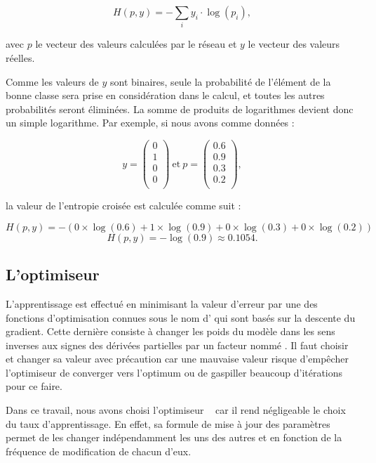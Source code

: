 $$
H(p, y) = -\sum_i y_i \cdot \log(p_i),
$$

avec $p$ le vecteur des valeurs calculées par le réseau et $y$ le vecteur des valeurs réelles.

Comme les valeurs de $y$ sont binaires, seule la probabilité de l'élément de
la bonne classe sera prise en considération dans le calcul, et toutes les autres
probabilités seront éliminées. La somme de produits de logarithmes devient
donc un simple logarithme.
Par exemple, si nous avons comme données :

$$
y =
\begin{pmatrix}
  0\\
  1\\
  0\\
  0\\
\end{pmatrix}
~
\mathrm{et}
~
p =
\begin{pmatrix}
  0.6\\
  0.9\\
  0.3\\
  0.2\\
\end{pmatrix},
$$

la valeur de l'entropie croisée est calculée comme suit :

$$
H(p, y) = -(0 \times \log(0.6) + 1 \times \log(0.9) + 0 \times \log(0.3) + 0 \times \log(0.2))
$$
$$
H(p, y) = -\log(0.9) \approx 0.1054.
$$

\subsection{L'optimiseur}

L’apprentissage est effectué en minimisant la valeur d'erreur par une des fonctions
d'optimisation connues sous le nom d' qui sont basés sur la descente
du gradient. Cette dernière consiste à changer les poids du modèle dans les sens inverses
aux signes des dérivées partielles par un facteur nommé .
Il faut choisir et changer sa valeur avec précaution car une mauvaise valeur
risque d'empêcher l'optimiseur de converger vers l'optimum ou de gaspiller beaucoup
d'itérations pour ce faire.~\cite{DBLP:journals/corr/Ruder16}

Dans ce travail, nous avons choisi l'optimiseur ~\cite{DBLP:journals/corr/abs-1212-5701}
car il rend négligeable le choix du taux d'apprentissage. En effet, sa
formule de mise à jour des paramètres permet de les changer indépendamment
les uns des autres et en fonction de la fréquence de modification de chacun d'eux.~\cite{DBLP:journals/corr/Ruder16}

